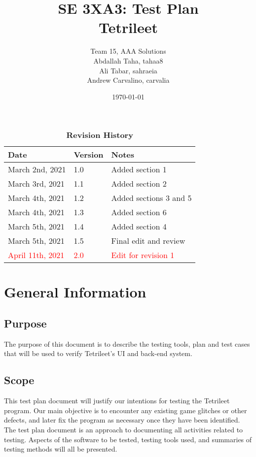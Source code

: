 \documentclass[12pt, titlepage]{article}
\title{SE 3XA3: Test Plan\\Tetrileet}
\author{Team 15, AAA Solutions
		\\ Abdallah Taha, tahaa8
		\\ Ali Tabar, sahraeia
		\\ Andrew Carvalino, carvalia
}
\date{\today}
\begin{document}
\maketitle

\tableofcontents
\listoftables
\listoffigures

\begin{table}[bp]
\caption{\bf Revision History}
\begin{tabularx}{\textwidth}{p{3cm}p{2cm}X}
\toprule {\bf Date} & {\bf Version} & {\bf Notes}\\
\midrule
March 2nd, 2021 & 1.0 & Added section 1\\
March 3rd, 2021 & 1.1 & Added section 2\\
March 4th, 2021 & 1.2 & Added sections 3 and 5\\
March 4th, 2021 & 1.3 & Added section 6\\
March 5th, 2021 & 1.4 & Added section 4\\
March 5th, 2021 & 1.5 & Final edit and review\\
\textcolor{red}{April 11th, 2021} &\textcolor{red}{2.0} & \textcolor{red}{Edit for revision 1}\\
\bottomrule
\end{tabularx}
\end{table}

\newpage


\section{General Information}

\subsection{Purpose}
The purpose of this document is to describe the testing tools, plan and test cases that will be used to verify Tetrileet's UI and back-end system.
\subsection{Scope}
This test plan document will justify our intentions for testing the Tetrileet program. Our main objective is to encounter any existing game glitches or other defects, and later fix the program as necessary once they have been identified.\\
The test plan document is an approach to documenting all activities related to testing. 
Aspects of the software to be tested, testing tools used, and summaries of testing methods will all be presented. 
\end{document}
